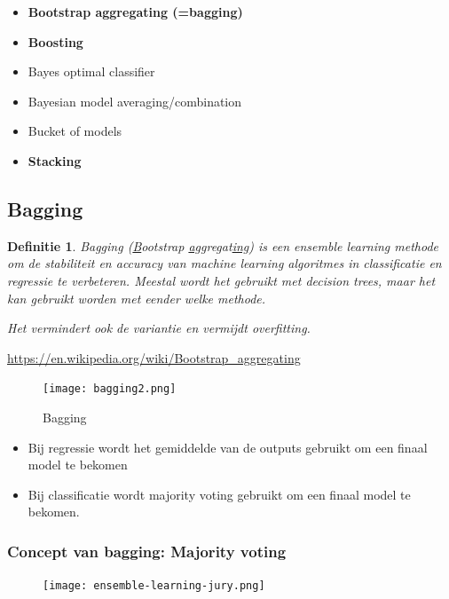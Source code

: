 \documentclass{article}
\newtheorem{theorem}{Definitie}[section]
\begin{document}
\begin{itemize}
    \item \textbf{Bootstrap aggregating (=bagging)}
    \item \textbf{Boosting}
    \item Bayes optimal classifier
    \item Bayesian model averaging/combination
    \item Bucket of models
    \item \textbf{Stacking}
\end{itemize}

\subsection{Bagging}

\begin{theorem}
    Bagging (\underline{B}ootstrap \underline{agg}regat\underline{ing}) is 
    een ensemble learning methode om de stabiliteit en accuracy van machine 
    learning algoritmes in classificatie en regressie te verbeteren. 
    Meestal wordt het gebruikt met decision trees, maar het kan gebruikt worden
    met eender welke methode. 

    Het vermindert ook de variantie en vermijdt overfitting.
\end{theorem}

\url{https://en.wikipedia.org/wiki/Bootstrap_aggregating}

\begin{figure}[H]
    \centering
    \texttt{[image: bagging2.png]}
    \caption{Bagging}
\end{figure}

\begin{itemize}
    \item Bij regressie wordt het gemiddelde van de outputs gebruikt om een finaal model te bekomen
    \item Bij classificatie wordt majority voting gebruikt om een finaal model te bekomen.
\end{itemize}

\subsubsection{Concept van bagging: Majority voting}

\begin{figure}[H]
    \centering
    \texttt{[image: ensemble-learning-jury.png]}
\end{figure}
\end{document}
